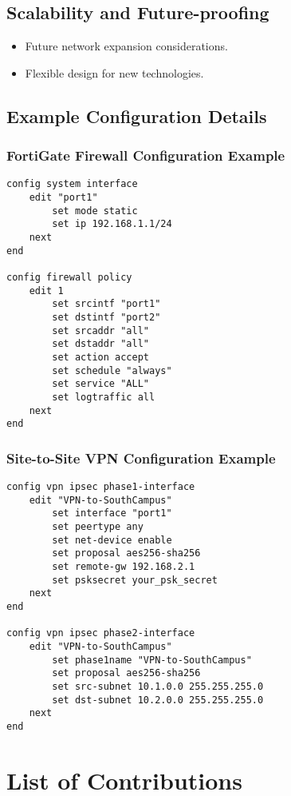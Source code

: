 \documentclass[12pt]{report}
\begin{document}
\subsection{Scalability and Future-proofing}
\begin{itemize}
    \item Future network expansion considerations.
    \item Flexible design for new technologies.
\end{itemize}

\subsection{Example Configuration Details}

\subsubsection{FortiGate Firewall Configuration Example} 
\begin{verbatim}
config system interface
    edit "port1"
        set mode static
        set ip 192.168.1.1/24
    next
end

config firewall policy
    edit 1
        set srcintf "port1"
        set dstintf "port2"
        set srcaddr "all"
        set dstaddr "all"
        set action accept
        set schedule "always"
        set service "ALL"
        set logtraffic all
    next
end
\end{verbatim}

\subsubsection{Site-to-Site VPN Configuration Example}
\begin{verbatim}
config vpn ipsec phase1-interface
    edit "VPN-to-SouthCampus"
        set interface "port1"
        set peertype any
        set net-device enable
        set proposal aes256-sha256
        set remote-gw 192.168.2.1
        set psksecret your_psk_secret
    next
end

config vpn ipsec phase2-interface
    edit "VPN-to-SouthCampus"
        set phase1name "VPN-to-SouthCampus"
        set proposal aes256-sha256
        set src-subnet 10.1.0.0 255.255.255.0
        set dst-subnet 10.2.0.0 255.255.255.0
    next
end
\end{verbatim}

\section{List of Contributions}
\end{document}
